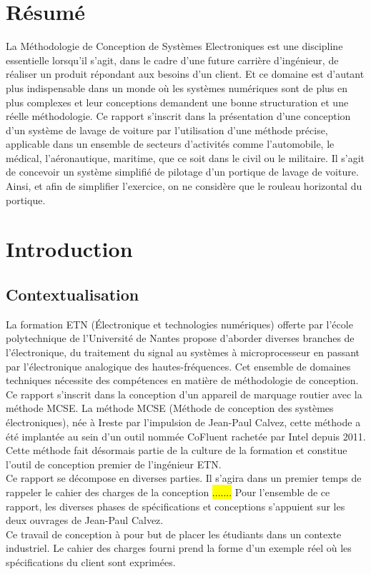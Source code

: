 \vspace*{4cm}
\section*{Résumé}
La Méthodologie de Conception de Systèmes Electroniques est une discipline essentielle lorsqu'il s'agit, dans le cadre d'une future carrière d'ingénieur, de réaliser un produit répondant aux besoins d'un client. 
Et ce domaine est d'autant plus indispensable dans un monde où les systèmes numériques sont de plus en plus complexes et leur conceptions demandent une bonne structuration et une réelle méthodologie. 
Ce rapport s'inscrit dans la présentation d'une conception d'un système de lavage de voiture par l'utilisation d'une méthode précise, applicable dans un ensemble de secteurs d'activités comme l'automobile, le médical, l'aéronautique, maritime, que ce soit dans le civil ou le militaire.
Il s'agit de concevoir un système simplifié de pilotage d'un portique de lavage de voiture. 
Ainsi, et afin de simplifier l'exercice, on ne considère que le rouleau horizontal du portique.

\newpage



\section{Introduction}

\subsection{Contextualisation}
La formation ETN (Électronique et technologies numériques) offerte par l'école polytechnique de l'Université de Nantes propose d'aborder diverses branches de l'électronique, du traitement du signal au systèmes à microprocesseur en passant par l'électronique analogique des hautes-fréquences. 
Cet ensemble de domaines techniques nécessite des compétences en matière de méthodologie de conception. Ce rapport s'inscrit dans la conception d'un appareil de marquage routier avec la méthode MCSE. 
La méthode MCSE (Méthode de conception des systèmes électroniques), née à Ireste par l'impulsion de Jean-Paul Calvez, cette méthode a été implantée au sein d'un outil nommée CoFluent rachetée par Intel\mbox{\textregistered } depuis 2011. Cette méthode fait désormais partie de la culture de la formation et constitue l'outil de conception premier de l'ingénieur ETN.\\
Ce rapport se décompose en diverses parties. 
Il s'agira dans un premier temps de rappeler le cahier des charges de la conception \hl{.......} %
Pour l'ensemble de ce rapport, les diverses phases de spécifications et conceptions s'appuient sur les deux ouvrages de Jean-Paul Calvez. \cite{Calvez_1} \cite{Calvez_2} \\
Ce travail de conception à pour but de placer les étudiants dans un contexte industriel. Le cahier des charges fourni prend la forme d'un exemple réel où les spécifications du client sont exprimées.

